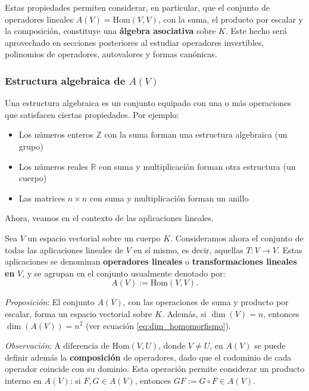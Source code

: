 \begin{tcolorbox}[remember, title=Observación]
  Estas propiedades permiten considerar, en particular, que el conjunto de operadores lineales \(A(V) = \text{Hom}(V, V)\), con la suma, el producto por escalar y la composición, constituye una \textbf{álgebra asociativa} sobre \(K\). Este hecho será aprovechado en secciones posteriores al estudiar operadores invertibles, polinomios de operadores, autovalores y formas canónicas.
\end{tcolorbox}

\subsubsection{Estructura algebraica de \(A(V)\)}

Una estructura algebraica es un conjunto equipado con una o más operaciones que satisfacen ciertas propiedades. Por ejemplo:
\begin{itemize}
  \item Los números enteros \(\mathbb{Z}\) con la suma forman una estructura algebraica (un grupo)
  \item Los números reales \(\mathbb{R}\) con suma y multiplicación forman otra estructura (un cuerpo)
  \item Las matrices \(n\times n\) con suma y multiplicación forman un anillo
\end{itemize}
Ahora, veamos en el contexto de las aplicaciones lineales.

Sea \(V\) un espacio vectorial sobre un cuerpo \(K\). Consideramos ahora el conjunto de todas las aplicaciones lineales de \(V\) en sí mismo, es decir, aquellas \(T : V \rightarrow V\). Estas aplicaciones se denominan \textbf{operadores lineales} o \textbf{transformaciones lineales en} \(V\), y se agrupan en el conjunto usualmente denotado por:
\[
  A(V) := \text{Hom}(V, V).
\]

\textit{Proposición}: El conjunto \(A(V)\), con las operaciones de suma y producto por escalar, forma un espacio vectorial sobre \(K\). Además, si \(\dim(V) = n\), entonces \(\dim(A(V)) = n^2\) (ver ecuación \ref{eq:dim_homomorfismo}).

\textit{Observación}: A diferencia de \(\text{Hom}(V, U)\), donde \(V \ne U\), en \(A(V)\) se puede definir además la \textbf{composición} de operadores, dado que el codominio de cada operador coincide con su dominio. Esta operación permite considerar un producto interno en \(A(V)\): si \(F, G \in A(V)\), entonces \(GF := G \circ F \in A(V)\).

